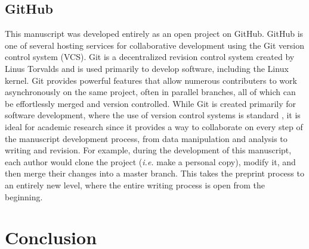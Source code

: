 \documentclass[letterpaper,twocolumn,superscriptaddress,showkeys,longbibliography]{revtex4-1}
\begin{document}
\subsection{GitHub}

This manuscript was developed entirely as an open project on GitHub. GitHub is
one of several hosting services for collaborative development using the Git
version control system (VCS).  Git is a decentralized revision control system
created by Linus Torvalds and is used primarily to develop software, including
the Linux kernel. Git provides powerful features that allow numerous
contributers to work asynchronously on the same project, often in parallel
branches, all of which can be effortlessly merged and version controlled.  While
Git is created primarily for software development, where the use of version
control systems is standard \cite{aru12}, it is ideal for academic research
since it provides a way to collaborate on every step of the manuscript
development process, from data manipulation and analysis to writing and
revision. For example, during the development of this manuscript, each author
would clone the project (\emph{i.e.} make a personal copy), modify it, and then
merge their changes into a master branch. This takes the preprint process to an
entirely new level, where the entire writing process is open from the beginning.

\section{Conclusion}
\end{document}
